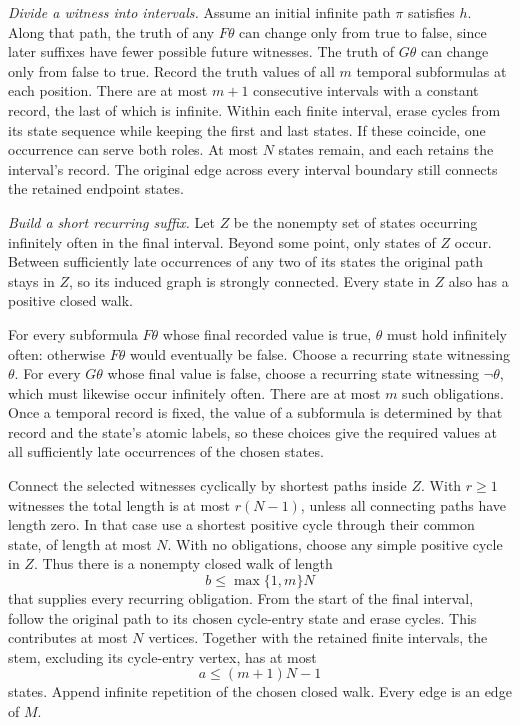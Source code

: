 \emph{Divide a witness into intervals.}
Assume an initial infinite path \(\pi\) satisfies \(h\).
Along that path, the truth of any \(F\theta\) can change
only from true to false, since later suffixes have fewer
possible future witnesses. The truth of \(G\theta\)
can change only from false to true. Record the truth
values of all \(m\) temporal subformulas at each position.
There are at most \(m+1\) consecutive intervals with a
constant record, the last of which is infinite.
Within each finite interval, erase cycles from its
state sequence while keeping the first and last states.
If these coincide, one occurrence can serve both roles.
At most \(N\) states remain, and each retains the interval's
record. The original edge across every interval boundary
still connects the retained endpoint states.

\emph{Build a short recurring suffix.}
Let \(Z\) be the nonempty set of states occurring infinitely
often in the final interval. Beyond some point, only
states of \(Z\) occur. Between sufficiently late occurrences
of any two of its states the original path stays in \(Z\),
so its induced graph is strongly connected. Every state
in \(Z\) also has a positive closed walk.

For every subformula \(F\theta\) whose final recorded
value is true, \(\theta\) must hold infinitely often:
otherwise \(F\theta\) would eventually be false. Choose
a recurring state witnessing \(\theta\).
For every \(G\theta\) whose final value is false, choose
a recurring state witnessing \(\neg\theta\), which must
likewise occur infinitely often. There are at most \(m\)
such obligations. Once a temporal record is fixed, the
value of a subformula is determined by that record
and the state's atomic labels, so these choices give
the required values at all sufficiently late occurrences
of the chosen states.

Connect the selected witnesses cyclically by shortest
paths inside \(Z\). With \(r\geq1\) witnesses the total
length is at most \(r(N-1)\), unless all connecting
paths have length zero. In that case use a shortest
positive cycle through their common state, of length
at most \(N\). With no obligations, choose any simple
positive cycle in \(Z\). Thus there is a nonempty
closed walk of length
\[
 b\leq\max\{1,m\}N
\]
that supplies every recurring obligation.
From the start of the final interval, follow the
original path to its chosen cycle-entry state and
erase cycles. This contributes at most \(N\) vertices.
Together with the retained finite intervals, the stem,
excluding its cycle-entry vertex, has at most
\[
 a\leq(m+1)N-1
\]
states. Append infinite repetition of the chosen closed
walk. Every edge is an edge of \(M\).

